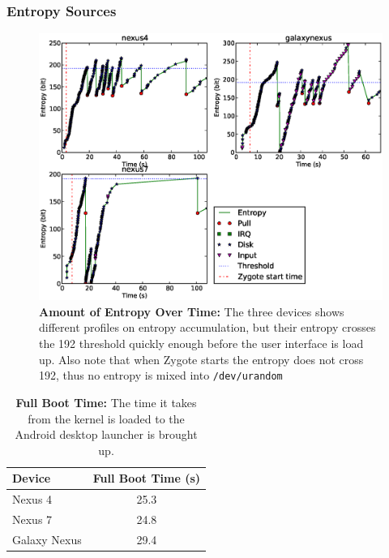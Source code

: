 \subsubsection{Entropy Sources}
\begin{figure}[t]
\begin{center}
\includegraphics[scale=0.6]{entropy.eps}
\end{center}
\caption{{\bf Amount of Entropy Over Time:} The three devices shows different profiles on entropy accumulation, but their entropy crosses the 192 threshold quickly enough before the user interface is load up. Also note that when Zygote starts the entropy does not cross 192, thus no entropy is mixed into \texttt{/dev/urandom}   }
\label{figentropy}
\end{figure}

\begin{table}
\begin{center}
\begin{tabular}{|l|c|}
\hline
\bf Device & \bf Full Boot Time (s) \\
\hline
Nexus 4 & 25.3 \\
\hline
Nexus 7 & 24.8 \\
\hline
Galaxy Nexus & 29.4
\hline

\end{tabular}
\end{center}
\caption{{\bf Full Boot Time:} The time it takes from the kernel is loaded to the Android desktop launcher is brought up.}
\label{tblboottime}
\end{table}

